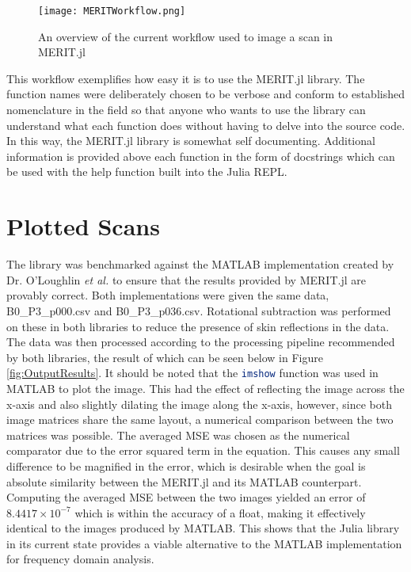 \begin{figure}[h!]
    \texttt{[image: MERITWorkflow.png]}
    \centering
    \caption{An overview of the current workflow used to image a scan in MERIT.jl} 
    \label{fig:MERITWorkflow}
\end{figure}

This workflow exemplifies how easy it is to use the MERIT.jl library. The function names were deliberately chosen to be
verbose and conform to established nomenclature in the field so that anyone who wants to use the library can understand
what each function does without having to delve into the source code. In this way, the MERIT.jl library is somewhat self
documenting. Additional information is provided above each function in the form of docstrings which can be used with the
help function built into the Julia REPL. 

\section{Plotted Scans}
\label{PlottedScans}
The library was benchmarked against the MATLAB implementation created by Dr. O'Loughlin \textit{et al.} to ensure that
the results provided by MERIT.jl are provably correct. Both implementations were given the same data, B0\_P3\_p000.csv
and B0\_P3\_p036.csv. Rotational subtraction was performed on these in both libraries to reduce the presence of skin
reflections in the data. The data was then processed according to the processing pipeline recommended by both libraries,
the result of which can be seen below in Figure \ref{fig:OutputResults}. It should be noted that the
\lstinline[language=Octave]{imshow} function was used in MATLAB to plot the image. This had the effect of reflecting the
image across the x-axis and also slightly dilating the image along the x-axis, however, since both image matrices share
the same layout, a numerical comparison between the two matrices was possible. The averaged MSE was chosen as the
numerical comparator due to the error squared term in the equation. This causes any small difference to be magnified in
the error, which is desirable when the goal is absolute similarity between the MERIT.jl and its MATLAB counterpart.
Computing the averaged MSE between the two images yielded an error of $8.4417 \times 10^{-7}$ which is within the
accuracy of a float, making it effectively identical to the images produced by MATLAB. This shows that the Julia library
in its current state provides a viable alternative to the MATLAB implementation for frequency domain analysis.

